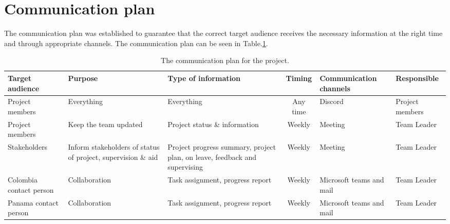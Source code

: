 \section{Communication plan}
\label{section:communication_plan}

The communication plan was established to guarantee that the correct target audience receives the necessary information at the right time and through appropriate channels. The communication plan can be seen in Table.\:\ref{tab:communication_plan}.

\begin{table}[H]
    \centering
    \caption{The communication plan for the project.}
    \label{tab:communication_plan}
    \begin{tabularx}{\textwidth}{|X|X|X|c|X|X|} \hline
         \textbf{Target audience}   & \textbf{Purpose}      & \textbf{Type of information}  & \textbf{Timing}   & \textbf{Communication channels}   & \textbf{Responsible}  \\ \hline
         Project members            & Everything            & Everything                    & Any time          & Discord                           & Project members       \\ \hline
         Project members            & Keep the team updated & Project status \& information & Weekly            & Meeting                           & Team Leader           \\ \hline
         Stakeholders & Inform stakeholders of status of project, supervision \& aid & Project progress summary, project plan, on leave, feedback and supervising& Weekly & Meeting & Team Leader \\ \hline
         Colombia contact person & Collaboration & Task assignment, progress report & Weekly & Microsoft teams and mail & Team Leader \\  \hline
         Panama contact person & Collaboration & Task assignment, progress report & Weekly & Microsoft teams and mail & Team Leader \\  \hline
    \end{tabularx}
\end{table}


